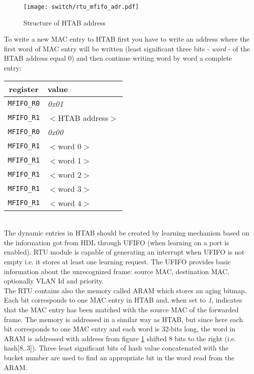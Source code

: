 \begin{figure}[ht]
  \begin{center}
    \texttt{[image: switch/rtu\_mfifo\_adr.pdf]}
  \end{center}
  \caption{Structure of HTAB address}
  \label{fig:rtu:htab_adr}
\end{figure}

To write a new MAC entry to HTAB first you have to write an address where the
first word of MAC entry will be written (least significant three bits -
\emph{word} - of the HTAB address equal 0) and then continue writing word by
word a complete entry:

\begin{tabular}{c|l}
  {\bf register} & {\bf value}\\
  \hline
  \texttt{MFIFO\_R0} & \emph{0x01}\\
  \texttt{MFIFO\_R1} & $<$HTAB address$>$\\
  \texttt{MFIFO\_R0} & \emph{0x00}\\
  \texttt{MFIFO\_R1} & $<$word 0$>$\\
  \texttt{MFIFO\_R1} & $<$word 1$>$\\
  \texttt{MFIFO\_R1} & $<$word 2$>$\\
  \texttt{MFIFO\_R1} & $<$word 3$>$\\
  \texttt{MFIFO\_R1} & $<$word 4$>$\\
\end{tabular}\\

The dynamic entries in HTAB should be created by learning mechanism based on the
information got from HDL through UFIFO (when learning on a port is enabled). RTU
module is capable of generating an interrupt when UFIFO is not empty i.e. it
stores at least one learning request. The UFIFO provides basic information
about the unrecognized frame: source MAC, destination MAC, optionally VLAN Id
and priority.\\

The RTU contains also the memory called ARAM which stores an aging bitmap. Each
bit corresponds to one MAC entry in HTAB and, when set to \emph{1}, indicates
that the MAC entry has been matched with the source MAC of the forwarded frame. The
memory is addressed in a similar way as HTAB, but since here each bit
corresponds to one MAC entry and each word is 32-bits long, the word in ARAM
is addressed with address from figure \ref{fig:rtu:htab_adr} shifted 8 bits to
the right (i.e. hash[8..3]). Three least significant bits of hash value
concatenated with the bucket number are used to find an appropriate bit in the word
read from the ARAM.\\

